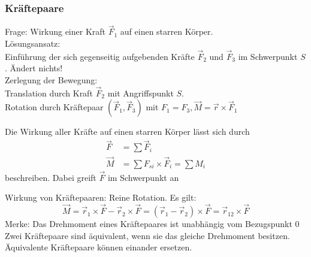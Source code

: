 \documentclass[a4paper]{scrartcl}
\renewcommand{\v}[1]{\vec{#1}}
\theoremstyle{definition}
\theoremstyle{plain}
\theoremstyle{plain}
\theoremstyle{remark}
\theoremstyle{remark}
\theoremstyle{remark}
\begin{document}
\subsubsection{Kräftepaare}
\label{sec-8-2-2}
Frage: Wirkung einer Kraft $\v F_1$ auf einen starren Körper. \\
        Lösungsansatz: \\
        Einführung der sich gegenseitig aufgebenden Kräfte $\v F_2$ und $\v F_3$ im Schwerpunkt $S$. Ändert nichts! \\
        Zerlegung der Bewegung: \\
        Translation durch Kraft $\v F_2$ mit Angriffspunkt $S$. \\
        Rotation durch Kräftepaar $(\v F_1, \v F_3)$ mit $F_1 = F_3, \v M = \v r \times \v F_1$

Die Wirkung aller Kräfte auf einen starren Körper lässt sich durch
\begin{align*}
\v F &= \sum \v F_i \tag{Gesamtkraft (Gesamtkraft)} \\
\v M &= \sum F_{si} \times \v F_i = \sum M_i \tag{Gesamtdrehmoment (Rotation)}
\end{align*}
beschreiben. Dabei greift $\v F$ im Schwerpunkt an

Wirkung von Kräftepaaren: Reine Rotation. Es gilt:
\[\v M = \v r_1 \times \v F - \v r_2 \times \v F = (\v r_1 - \v r_2)\times \v F = \v r_{12} \times \v F\]
Merke:
Das Drehmoment eines Kräftepaares ist unabhängig vom Bezugspunkt $0$ \\
        Zwei Kräftepaare sind äquivalent, wenn sie das gleiche Drehmoment besitzen. Äquivalente Kräftepaare können einander ersetzen.
\end{document}
